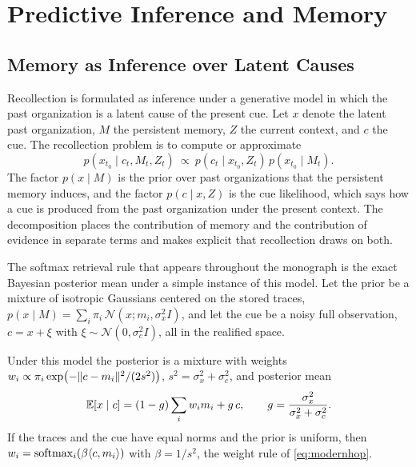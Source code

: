 \part{Predictive Inference and Memory}

\chapter{Memory as Inference over Latent Causes}\label{ch:inference}

Recollection is formulated as inference under a generative model in which the past organization is a latent cause of the present cue. Let $x$ denote the latent past organization, $M$ the persistent memory, $Z$ the current context, and $c$ the cue. The recollection problem is to compute or approximate
\begin{equation}\label{eq:posterior}
p(x_{t_0}\mid c_t,M_t,Z_t)\ \propto\ p(c_t\mid x_{t_0},Z_t)\,p(x_{t_0}\mid M_t).
\end{equation}
The factor $p(x\mid M)$ is the prior over past organizations that the persistent memory induces, and the factor $p(c\mid x,Z)$ is the cue likelihood, which says how a cue is produced from the past organization under the present context. The decomposition places the contribution of memory and the contribution of evidence in separate terms and makes explicit that recollection draws on both.

The softmax retrieval rule that appears throughout the monograph is the exact Bayesian posterior mean under a simple instance of this model. Let the prior be a mixture of isotropic Gaussians centered on the stored traces, $p(x\mid M)=\sum_i\pi_i\,\mathcal N(x;m_i,\sigma_x^2I)$, and let the cue be a noisy full observation, $c=x+\xi$ with $\xi\sim\mathcal N(0,\sigma_c^2I)$, all in the realified space.

\begin{proposition}\label{prop:posteriormean}
Under this model the posterior is a mixture with weights $w_i\propto\pi_i\exp\bigl(-\lVert c-m_i\rVert^2/(2s^2)\bigr)$, $s^2=\sigma_x^2+\sigma_c^2$, and posterior mean
\begin{equation}\label{eq:postmean}
\mathbb{E}[x\mid c]=(1-g)\sum_iw_im_i+g\,c,\qquad g=\frac{\sigma_x^2}{\sigma_x^2+\sigma_c^2}.
\end{equation}
If the traces and the cue have equal norms and the prior is uniform, then $w_i=\operatorname{softmax}_i(\beta\langle c,m_i\rangle)$ with $\beta=1/s^2$, the weight rule of \eqref{eq:modernhop}.
\end{proposition}

